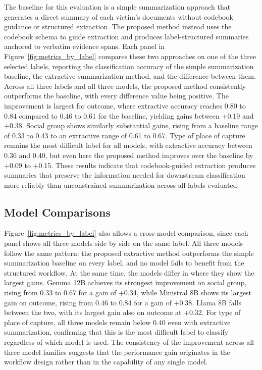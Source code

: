 \documentclass{article}
\begin{document}
The baseline for this evaluation is a simple summarization approach that generates a direct summary of each victim's documents without codebook guidance or structured extraction. The proposed method instead uses the codebook schema to guide extraction and produces label-structured summaries anchored to verbatim evidence spans. Each panel in Figure~\ref{fig:metrics_by_label} compares these two approaches on one of the three selected labels, reporting the classification accuracy of the simple summarization baseline, the extractive summarization method, and the difference between them. Across all three labels and all three models, the proposed method consistently outperforms the baseline, with every difference value being positive. The improvement is largest for outcome, where extractive accuracy reaches 0.80 to 0.84 compared to 0.46 to 0.61 for the baseline, yielding gains between +0.19 and +0.38. Social group shows similarly substantial gains, rising from a baseline range of 0.33 to 0.43 to an extractive range of 0.61 to 0.67. Type of place of capture remains the most difficult label for all models, with extractive accuracy between 0.36 and 0.40, but even here the proposed method improves over the baseline by +0.09 to +0.15. These results indicate that codebook-guided extraction produces summaries that preserve the information needed for downstream classification more reliably than unconstrained summarization across all labels evaluated.

\subsection{Model Comparisons}\label{model-comparisons}

Figure~\ref{fig:metrics_by_label} also allows a cross-model comparison, since each panel shows all three models side by side on the same label. All three models follow the same pattern: the proposed extractive method outperforms the simple summarization baseline on every label, and no model fails to benefit from the structured workflow. At the same time, the models differ in where they show the largest gains. Gemma 12B achieves its strongest improvement on social group, rising from 0.33 to 0.67 for a gain of +0.34, while Ministral 8B shows its largest gain on outcome, rising from 0.46 to 0.84 for a gain of +0.38. Llama 8B falls between the two, with its largest gain also on outcome at +0.32. For type of place of capture, all three models remain below 0.40 even with extractive summarization, confirming that this is the most difficult label to classify regardless of which model is used. The consistency of the improvement across all three model families suggests that the performance gain originates in the workflow design rather than in the capability of any single model.
\end{document}
